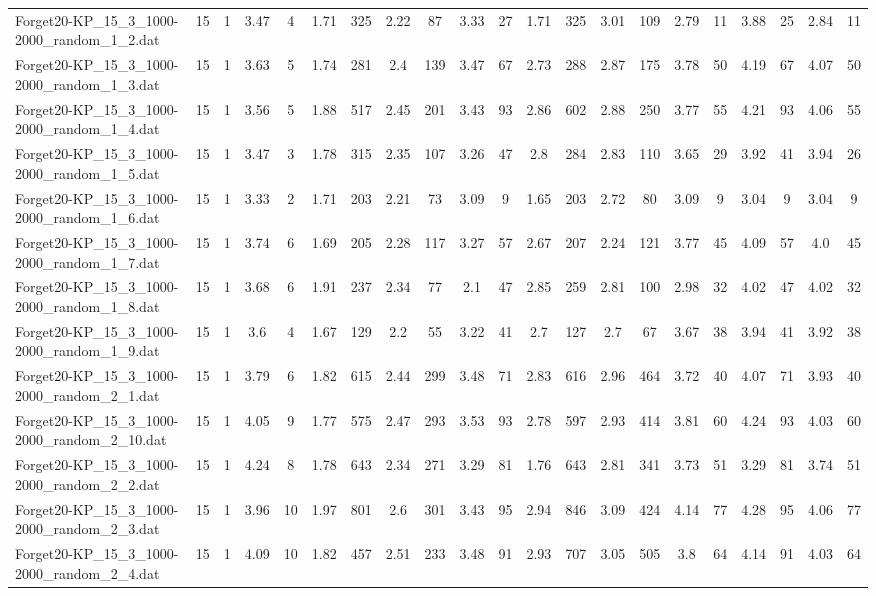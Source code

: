 \begin{sidewaystable}[!ht]
{\begin{tabular}{lcccccccccccccccccccc}
Forget20-KP\_15\_3\_1000-2000\_random\_1\_2.dat & 15 & 1 & 3.47 & 4 & 1.71 & 325 & 2.22 & 87 & 3.33 & 27 & 1.71 & 325 & 3.01 & 109 & 2.79 & 11 & 3.88 & 25 & 2.84 & 11 \\
Forget20-KP\_15\_3\_1000-2000\_random\_1\_3.dat & 15 & 1 & 3.63 & 5 & 1.74 & 281 & 2.4 & 139 & 3.47 & 67 & 2.73 & 288 & 2.87 & 175 & 3.78 & 50 & 4.19 & 67 & 4.07 & 50 \\
Forget20-KP\_15\_3\_1000-2000\_random\_1\_4.dat & 15 & 1 & 3.56 & 5 & 1.88 & 517 & 2.45 & 201 & 3.43 & 93 & 2.86 & 602 & 2.88 & 250 & 3.77 & 55 & 4.21 & 93 & 4.06 & 55 \\
Forget20-KP\_15\_3\_1000-2000\_random\_1\_5.dat & 15 & 1 & 3.47 & 3 & 1.78 & 315 & 2.35 & 107 & 3.26 & 47 & 2.8 & 284 & 2.83 & 110 & 3.65 & 29 & 3.92 & 41 & 3.94 & 26 \\
Forget20-KP\_15\_3\_1000-2000\_random\_1\_6.dat & 15 & 1 & 3.33 & 2 & 1.71 & 203 & 2.21 & 73 & 3.09 & 9 & 1.65 & 203 & 2.72 & 80 & 3.09 & 9 & 3.04 & 9 & 3.04 & 9 \\
Forget20-KP\_15\_3\_1000-2000\_random\_1\_7.dat & 15 & 1 & 3.74 & 6 & 1.69 & 205 & 2.28 & 117 & 3.27 & 57 & 2.67 & 207 & 2.24 & 121 & 3.77 & 45 & 4.09 & 57 & 4.0 & 45 \\
Forget20-KP\_15\_3\_1000-2000\_random\_1\_8.dat & 15 & 1 & 3.68 & 6 & 1.91 & 237 & 2.34 & 77 & 2.1 & 47 & 2.85 & 259 & 2.81 & 100 & 2.98 & 32 & 4.02 & 47 & 4.02 & 32 \\
Forget20-KP\_15\_3\_1000-2000\_random\_1\_9.dat & 15 & 1 & 3.6 & 4 & 1.67 & 129 & 2.2 & 55 & 3.22 & 41 & 2.7 & 127 & 2.7 & 67 & 3.67 & 38 & 3.94 & 41 & 3.92 & 38 \\
Forget20-KP\_15\_3\_1000-2000\_random\_2\_1.dat & 15 & 1 & 3.79 & 6 & 1.82 & 615 & 2.44 & 299 & 3.48 & 71 & 2.83 & 616 & 2.96 & 464 & 3.72 & 40 & 4.07 & 71 & 3.93 & 40 \\
Forget20-KP\_15\_3\_1000-2000\_random\_2\_10.dat & 15 & 1 & 4.05 & 9 & 1.77 & 575 & 2.47 & 293 & 3.53 & 93 & 2.78 & 597 & 2.93 & 414 & 3.81 & 60 & 4.24 & 93 & 4.03 & 60 \\
Forget20-KP\_15\_3\_1000-2000\_random\_2\_2.dat & 15 & 1 & 4.24 & 8 & 1.78 & 643 & 2.34 & 271 & 3.29 & 81 & 1.76 & 643 & 2.81 & 341 & 3.73 & 51 & 3.29 & 81 & 3.74 & 51 \\
Forget20-KP\_15\_3\_1000-2000\_random\_2\_3.dat & 15 & 1 & 3.96 & 10 & 1.97 & 801 & 2.6 & 301 & 3.43 & 95 & 2.94 & 846 & 3.09 & 424 & 4.14 & 77 & 4.28 & 95 & 4.06 & 77 \\
Forget20-KP\_15\_3\_1000-2000\_random\_2\_4.dat & 15 & 1 & 4.09 & 10 & 1.82 & 457 & 2.51 & 233 & 3.48 & 91 & 2.93 & 707 & 3.05 & 505 & 3.8 & 64 & 4.14 & 91 & 4.03 & 64 \\

\end{tabular}}
\end{sidewaystable}
